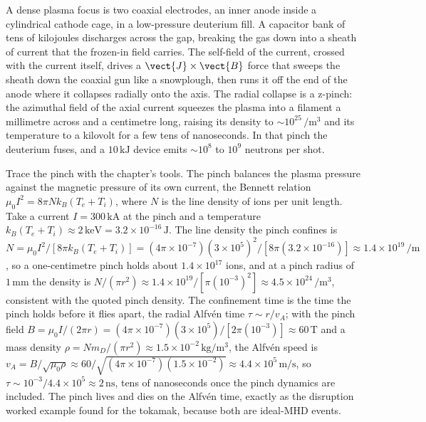 A dense plasma focus is two coaxial electrodes, an inner anode inside a
cylindrical cathode cage, in a low-pressure deuterium fill. A capacitor bank
of tens of kilojoules discharges across the gap, breaking the gas down into a
sheath of current that the frozen-in field carries. The self-field of the
current, crossed with the current itself, drives a $\vect{J}\times\vect{B}$
force that sweeps the sheath down the coaxial gun like a snowplough, then runs
it off the end of the anode where it collapses radially onto the axis. The
radial collapse is a z-pinch: the azimuthal field of the axial current
squeezes the plasma into a filament a millimetre across and a centimetre long,
raising its density to $\sim 10^{25}\,\si{\per\meter\cubed}$ and its
temperature to a kilovolt for a few tens of nanoseconds. In that pinch the
deuterium fuses, and a $10\,\si{\kilo\joule}$ device emits $\sim 10^{8}$ to
$10^{9}$ neutrons per shot.

Trace the pinch with the chapter's tools. The pinch balances the plasma
pressure against the magnetic pressure of its own current, the Bennett
relation $\mu_0 I^{2} = 8\pi N k_B(T_e + T_i)$, where $N$ is the line density
of ions per unit length. Take a current $I = 300\,\si{\kilo\ampere}$ at the
pinch and a temperature $k_B(T_e+T_i) \approx 2\,\si{\kilo\electronvolt} =
3.2\times 10^{-16}\,\si{\joule}$. The line density the pinch confines is $N =
\mu_0 I^{2}/[8\pi k_B(T_e+T_i)] = (4\pi\times 10^{-7})(3\times 10^{5})^{2}/
[8\pi(3.2\times 10^{-16})] \approx 1.4\times 10^{19}\,\si{\per\meter}$, so a
one-centimetre pinch holds about $1.4\times 10^{17}$ ions, and at a pinch
radius of $1\,\si{\milli\meter}$ the density is $N/(\pi r^{2}) \approx
1.4\times 10^{19}/[\pi(10^{-3})^{2}] \approx 4.5\times 10^{24}\,\si{\per\meter
\cubed}$, consistent with the quoted pinch density. The confinement time is the
time the pinch holds before it flies apart, the radial Alfv\'en time $\tau
\sim r/v_A$; with the pinch field $B = \mu_0 I/(2\pi r) = (4\pi\times 10^{-7})
(3\times 10^{5})/[2\pi(10^{-3})] \approx 60\,\si{\tesla}$ and a mass density
$\rho = N m_D/(\pi r^{2}) \approx 1.5\times 10^{-2}\,\si{\kilogram\per\meter
\cubed}$, the Alfv\'en speed is $v_A = B/\sqrt{\mu_0\rho} \approx 60/\sqrt{
(4\pi\times 10^{-7})(1.5\times 10^{-2})} \approx 4.4\times 10^{5}\,\si{\meter
\per\second}$, so $\tau \sim 10^{-3}/4.4\times 10^{5} \approx 2\,\si{\nano
\second}$, tens of nanoseconds once the pinch dynamics are included. The pinch
lives and dies on the Alfv\'en time, exactly as the disruption worked example
found for the tokamak, because both are ideal-MHD events.

